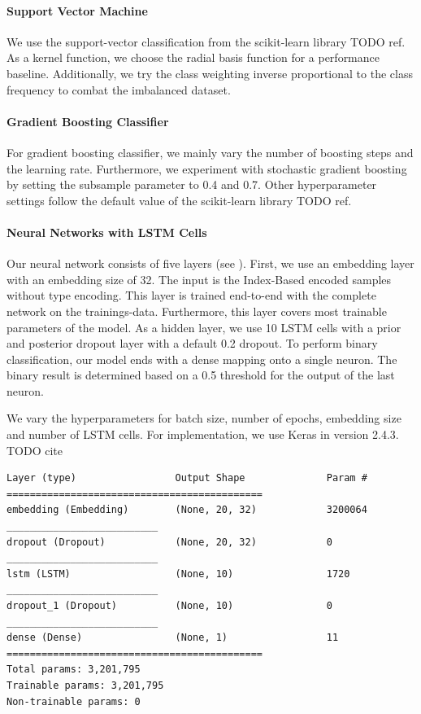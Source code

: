\paragraph{Support Vector Machine}
We use the support-vector classification from the scikit-learn library TODO ref. As a kernel function, we choose the radial basis function for a performance baseline. Additionally, we try the class weighting inverse proportional to the class frequency to combat the imbalanced dataset.
\paragraph{Gradient Boosting Classifier}
For gradient boosting classifier, we mainly vary the number of boosting steps and the learning rate. Furthermore, we experiment with stochastic gradient boosting by setting the subsample parameter to 0.4 and 0.7. Other hyperparameter settings follow the default value of the scikit-learn library TODO ref.
\paragraph{Neural Networks with LSTM Cells}
Our neural network consists of five layers (see ). First, we use an embedding layer with an embedding size of 32. The input is the Index-Based encoded samples without type encoding. This layer is trained end-to-end with the complete network on the trainings-data. Furthermore, this layer covers most trainable parameters of the model. As a hidden layer, we use 10 LSTM cells with a prior and posterior dropout layer with a default 0.2 dropout. To perform binary classification, our model ends with a dense mapping onto a single neuron. The binary result is determined based on a 0.5 threshold for the output of the last neuron.

We vary the hyperparameters for batch size, number of epochs, embedding size and number of LSTM cells. For implementation, we use Keras in version 2.4.3. TODO cite

\begin{lstlisting}[label=lst:lstm, caption={Summary of our LSTM network. We use an embedding layer of size 32, 10 LSTM cells, a dropout layer before and after the LSTM layer with a default dropout ratio of 0.2 and a dense mapping to a single output neuron for binary classification with a threshold of 0.5.}]
Layer (type)                 Output Shape              Param #
============================================
embedding (Embedding)        (None, 20, 32)            3200064
__________________________
dropout (Dropout)            (None, 20, 32)            0
__________________________
lstm (LSTM)                  (None, 10)                1720
__________________________
dropout_1 (Dropout)          (None, 10)                0
__________________________
dense (Dense)                (None, 1)                 11
============================================
Total params: 3,201,795
Trainable params: 3,201,795
Non-trainable params: 0\end{lstlisting}